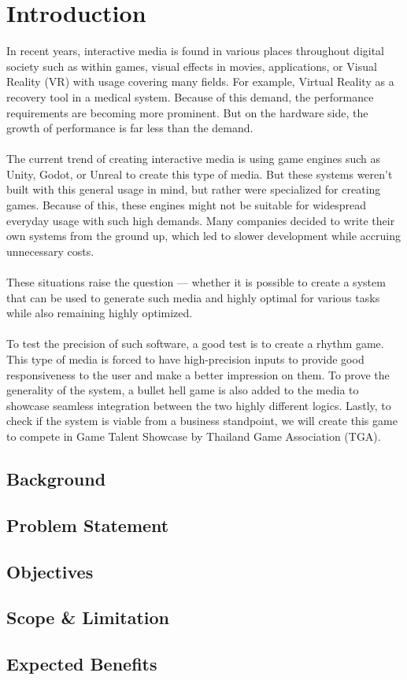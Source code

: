 \section{Introduction}
\label{sec:introduction}
In recent years, interactive media is found in various places throughout digital society
such as within games, visual effects in movies, applications, or Visual Reality (VR)
with usage covering many fields.
For example, Virtual Reality as a recovery tool in a medical system.
Because of this demand, the performance requirements are becoming more prominent.
But on the hardware side, the growth of performance
is far less than the demand.
\\\\
The current trend of creating interactive media is using game engines such as Unity, Godot, or
Unreal to create this type of media.
But these systems weren't built with this general usage in mind, but rather were specialized for creating games.
Because of this, these engines might not be suitable for widespread everyday usage with such high demands.
Many companies decided to write their own systems from the ground up, which led to slower development while accruing
unnecessary costs.
\\\\
These situations raise the question — whether it is possible to create a system that can be used to generate such media
and highly optimal for various tasks while also remaining highly optimized.
\\\\
To test the precision of such software, a good test is to create a rhythm game.
This type of media is forced to have high-precision inputs to provide good responsiveness to
the user and make a better impression on them.
To prove the generality of the system, a bullet hell game is also added to the media to showcase seamless
integration between the two highly different logics.
Lastly, to check if the system is viable from a business standpoint, we will create this game
to compete in Game Talent Showcase by Thailand Game Association (TGA).

\subsection{Background}
\label{subsec:background}

\subsection{Problem Statement}
\label{subsec:problem-statement}

\subsection{Objectives}
\label{subsec:objectives}

\subsection{Scope \& Limitation}
\label{subsec:scope-and-limitation}

\subsection{Expected Benefits}
\label{subsec:expected-benefits}